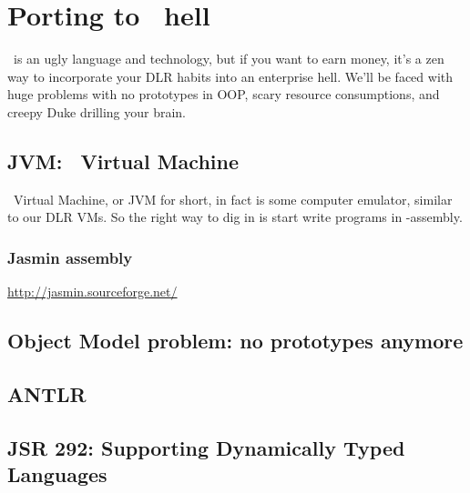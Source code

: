 \part{Porting to \J\ hell}

\J\ is an ugly language and technology, but if you want to earn money, it's a
zen way to incorporate your DLR habits into an enterprise hell. We'll be faced
with huge problems with no prototypes in OOP, scary resource consumptions, and
creepy Duke drilling your brain.

\begin{center}\end{center}

\chapter{JVM: \J\ Virtual Machine}\clearpage

\J\ Virtual Machine, or JVM for short, in fact is some computer emulator,
similar to our DLR VMs. So the right way to dig in is start write programs in
\J-assembly.

\section{Jasmin assembly}

\url{http://jasmin.sourceforge.net/}\bigskip

\chapter{Object Model problem: no prototypes anymore}

\chapter{ANTLR}

\chapter{JSR 292: Supporting Dynamically Typed Languages}